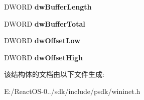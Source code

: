 \begin{DoxyCompactItemize}
D\+W\+O\+RD {\bfseries dw\+Buffer\+Length}
\item 
\mbox{\label{struct___i_n_t_e_r_n_e_t___b_u_f_f_e_r_s_a_a5c8d34d03b0edd25a98e9dc54f49fb6c}} 
D\+W\+O\+RD {\bfseries dw\+Buffer\+Total}
\item 
\mbox{\label{struct___i_n_t_e_r_n_e_t___b_u_f_f_e_r_s_a_a1dc9533b453301a13e919b8b1482c84e}} 
D\+W\+O\+RD {\bfseries dw\+Offset\+Low}
\item 
\mbox{\label{struct___i_n_t_e_r_n_e_t___b_u_f_f_e_r_s_a_a12ae17355e4a0f37544c73d735c93315}} 
D\+W\+O\+RD {\bfseries dw\+Offset\+High}
\end{DoxyCompactItemize}


该结构体的文档由以下文件生成\+:\begin{DoxyCompactItemize}
\item 
E\+:/\+React\+O\+S-\/0../sdk/include/psdk/wininet.\+h\end{DoxyCompactItemize}
